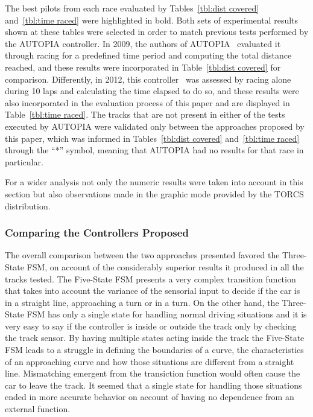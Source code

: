 	The best pilots from each race evaluated by Tables~\ref{tbl:dist covered} and~\ref{tbl:time raced} were highlighted in bold. Both sets of experimental results shown at these tables were selected in order to match previous tests performed by the AUTOPIA controller. In 2009, the authors of AUTOPIA~\cite{AUTOPIA2009} evaluated it through racing for a predefined time period and computing the total distance reached, and these results were incorporated in Table~\ref{tbl:dist covered} for comparison. Differently, in 2012, this controller~\cite{AUTOPIA} was assessed by racing alone during 10 laps and calculating the time elapsed to do so, and these results were also incorporated in the evaluation process of this paper and are displayed in Table~\ref{tbl:time raced}. The tracks that are not present in either of the tests executed by AUTOPIA were validated only between the approaches proposed by this paper, which was informed in Tables~\ref{tbl:dist covered} and~\ref{tbl:time raced} through the ``*'' symbol, meaning that AUTOPIA had no results for that race in particular.
	
	For a wider analysis not only the numeric results were taken into account in this section but also observations made in the graphic mode provided by the TORCS distribution.
\subsubsection{Comparing the Controllers Proposed} \label{subsubsec:CompControllers}
	
	The overall comparison between the two approaches presented favored the Three-State FSM, on account of the considerably superior results it produced in all the tracks tested. The Five-State FSM presents a very complex transition function that takes into account the variance of the sensorial input to decide if the car is in a straight line, approaching a turn or in a turn. On the other hand, the Three-State FSM has only a single state for handling normal driving situations and it is very easy to say if the controller is inside or outside the track only by checking the track sensor. By having multiple states acting inside the track the Five-State FSM leads to a struggle in defining the boundaries of a curve, the characteristics of an approaching curve and how those situations are different from a straight line. Mismatching emergent from the transiction function would often cause the car to leave the track. It seemed that a single state for handling those situations ended in more accurate behavior on account of having no dependence from an external function.
	
